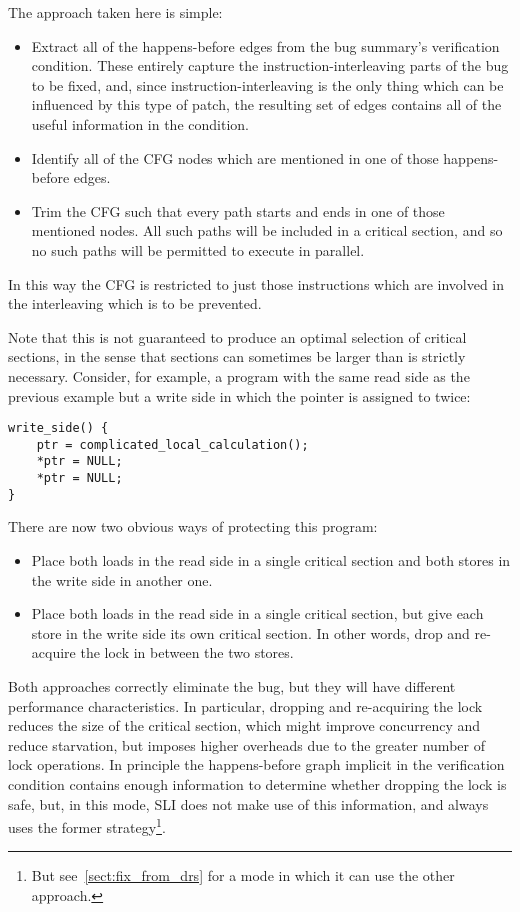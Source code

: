 The approach taken here is simple:

\begin{itemize}
\item
  Extract all of the happens-before edges from the bug summary's
  verification condition.  These entirely capture the
  instruction-interleaving parts of the bug to be fixed, and, since
  instruction-interleaving is the only thing which can be influenced
  by this type of patch, the resulting set of
  edges contains all of the useful information in the condition.
\item
  Identify all of the CFG nodes which are mentioned in one of those
  happens-before edges.
\item
  Trim the CFG such that every path starts and ends in one of those
  mentioned nodes.  All such paths will be included in a critical
  section, and so no such paths will be permitted to execute in
  parallel.
\end{itemize}

In this way the CFG is restricted to just those instructions which are
involved in the interleaving which is to be prevented.

Note that this is not guaranteed to produce an optimal selection of
critical sections, in the sense that sections can sometimes be larger
than is strictly necessary.  Consider, for example, a program with the
same read side as the previous example but a write side in which the
pointer is assigned to twice:

\begin{verbatim}
write_side() {
    ptr = complicated_local_calculation();
    *ptr = NULL;
    *ptr = NULL;
}
\end{verbatim}
    
There are now two obvious ways of protecting this program:

\begin{itemize}
\item
  Place both loads in the read side in a single critical section and
  both stores in the write side in another one.
\item
  Place both loads in the read side in a single critical section, but
  give each store in the write side its own critical section.  In
  other words, drop and re-acquire the lock in between the two stores.
\end{itemize}

Both approaches correctly eliminate the bug, but they will have
different performance characteristics.  In particular, dropping and
re-acquiring the lock reduces the size of the critical section, which
might improve concurrency and reduce starvation, but imposes higher
overheads due to the greater number of lock operations.  In principle
the happens-before graph implicit in the verification condition
contains enough information to determine whether dropping the lock is
safe, but, in this mode, SLI
does not make use of this information, and always uses the former
strategy\footnote{But see~\ref{sect:fix_from_drs} for a mode in which
  it can use the other approach.}.

